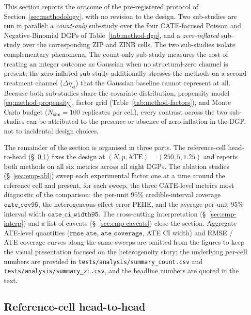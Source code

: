 \documentclass[11pt]{article}
\theoremstyle{plain}
\theoremstyle{definition}
\theoremstyle{remark}
\newcommand{\etazi}{\eta_{\mathrm{zi}}}
\newcommand{\Detazi}{\Delta\etazi}
\begin{document}
This section reports the outcome of the pre-registered protocol of
Section~\ref{sec:methodology}, with no revision to the design. Two
sub-studies are run in parallel: a \emph{count-only} sub-study over
the four CATE-focused Poisson and Negative-Binomial DGPs of
Table~\ref{tab:method-dgp}, and a \emph{zero-inflated} sub-study over
the corresponding ZIP and ZINB cells. The two sub-studies isolate
complementary phenomena. The count-only sub-study measures the cost
of treating an integer outcome as Gaussian when no structural-zero
channel is present; the zero-inflated sub-study additionally stresses
the methods on a second treatment channel ($\Detazi$) that the
Gaussian baseline cannot represent at all. Because both sub-studies
share the covariate distribution, propensity model
\eqref{eq:method-propensity}, factor grid
(Table~\ref{tab:method-factors}), and Monte Carlo budget
($N_{\mathrm{sim}} = 100$ replicates per cell), every contrast
across the two sub-studies can be attributed to the presence or
absence of zero-inflation in the DGP, not to incidental design
choices.

The remainder of the section is organised in three parts. The
reference-cell head-to-head (\S~\ref{sec:emp-ref}) fixes the design
at $(N, p, \mathrm{ATE}) = (250, 5, 1.25)$ and reports both methods
on all six metrics across all eight DGPs. The ablation studies
(\S~\ref{sec:emp-abl}) sweep each experimental factor one at a time
around the reference cell and present, for each sweep, the three
CATE-level metrics most diagnostic of the comparison: the per-unit
$95\%$ credible-interval coverage $\mathtt{cate\_cov95}$, the
heterogeneous-effect error PEHE, and the average per-unit $95\%$
interval width $\mathtt{cate\_ci\_width95}$. The cross-cutting
interpretation (\S~\ref{sec:emp-interp}) and a list of caveats
(\S~\ref{sec:emp-caveats}) close the section. Aggregate ATE-level
quantities ($\mathtt{rmse\_ate}$, $\mathtt{ate\_coverage}$, ATE CI
width) and RMSE / ATE coverage curves along the same sweeps are
omitted from the figures to keep the visual presentation focused on
the heterogeneity story; the underlying per-cell numbers are
provided in \texttt{tests/analysis/summary\_count.csv} and
\texttt{tests/analysis/summary\_zi.csv}, and the headline numbers
are quoted in the text.

\subsection{Reference-cell head-to-head}\label{sec:emp-ref}
\end{document}
